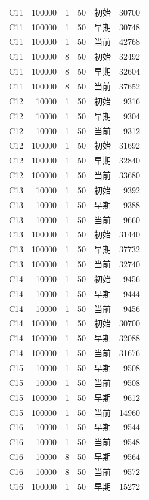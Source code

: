 \documentclass[UTF8,a4paper,10pt,twocolumn,fontset=fandol]{ctexart}
\begin{document}
\begin{longtable}{@{}lrrrlr@{}}
C11 & 100000 & 1 & 50 & 初始 & 30700 \\
C11 & 100000 & 1 & 50 & 早期 & 30748 \\
C11 & 100000 & 1 & 50 & 当前 & 42768 \\
C11 & 100000 & 8 & 50 & 初始 & 32492 \\
C11 & 100000 & 8 & 50 & 早期 & 32604 \\
C11 & 100000 & 8 & 50 & 当前 & 37652 \\
C12 & 10000 & 1 & 50 & 初始 & 9316 \\
C12 & 10000 & 1 & 50 & 早期 & 9304 \\
C12 & 10000 & 1 & 50 & 当前 & 9312 \\
C12 & 100000 & 1 & 50 & 初始 & 31692 \\
C12 & 100000 & 1 & 50 & 早期 & 32840 \\
C12 & 100000 & 1 & 50 & 当前 & 33680 \\
C13 & 10000 & 1 & 50 & 初始 & 9392 \\
C13 & 10000 & 1 & 50 & 早期 & 9388 \\
C13 & 10000 & 1 & 50 & 当前 & 9660 \\
C13 & 100000 & 1 & 50 & 初始 & 31440 \\
C13 & 100000 & 1 & 50 & 早期 & 37732 \\
C13 & 100000 & 1 & 50 & 当前 & 32740 \\
C14 & 10000 & 1 & 50 & 初始 & 9456 \\
C14 & 10000 & 1 & 50 & 早期 & 9444 \\
C14 & 10000 & 1 & 50 & 当前 & 9456 \\
C14 & 100000 & 1 & 50 & 初始 & 30700 \\
C14 & 100000 & 1 & 50 & 早期 & 32088 \\
C14 & 100000 & 1 & 50 & 当前 & 31676 \\
C15 & 10000 & 1 & 50 & 早期 & 9508 \\
C15 & 10000 & 1 & 50 & 当前 & 9508 \\
C15 & 100000 & 1 & 50 & 早期 & 9612 \\
C15 & 100000 & 1 & 50 & 当前 & 14960 \\
C16 & 10000 & 1 & 50 & 早期 & 9544 \\
C16 & 10000 & 1 & 50 & 当前 & 9548 \\
C16 & 10000 & 8 & 50 & 早期 & 9564 \\
C16 & 10000 & 8 & 50 & 当前 & 9572 \\
C16 & 100000 & 1 & 50 & 早期 & 15272 \\

\end{longtable}
\end{document}
